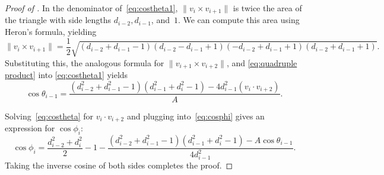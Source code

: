 \documentclass[10pt,a4paper]{amsart}
\begin{document}
\begin{proof}[{Proof of }]
	In the denominator of~\eqref{eq:costheta1}, $\|v_i \times v_{i+1}\|$ is twice the area of the triangle with side lengths $d_{i-2}, d_{i-1}$, and~$1$. We can compute this area using Heron's formula, yielding
	\[
		\|v_i \times v_{i+1}\| = \frac{1}{2} \sqrt{(d_{i-2}+d_{i-1}-1)(d_{i-2}-d_{i-1}+1)(-d_{i-2}+d_{i-1}+1)(d_{i-2}+d_{i-1}+1)}.
	\]
	Substituting this, the analogous formula for $\|v_{i+1}\times v_{i+2}\|$, and \eqref{eq:quadruple product} into \eqref{eq:costheta1} yields
	\begin{equation}\label{eq:costheta}
		 \cos\theta_{i-1}=\frac{(d_{i-2}^2 + d_{i-1}^2 - 1)(d_{i-1}^2 + d_{i}^2 - 1) - 4d_{i-1}^2 (v_i \cdot v_{i+2})}{A}.
	\end{equation}
	
	
	
	Solving~\eqref{eq:costheta} for $v_i \cdot v_{i+2}$ and plugging into~\eqref{eq:cosphi} gives an expression for $\cos \phi_i$:
	\[
		\cos\phi_i = \frac{d_{i-2}^2+d_i^2}{2} - 1 - \frac{(d_{i-2}^2 + d_{i-1}^2 - 1)(d_{i-1}^2 + d_{i}^2 - 1) - A \cos \theta_{i-1}}{4 d_{i-1}^2}.
	\]
	Taking the inverse cosine of both sides completes the proof.
	\end{proof}
\end{document}
